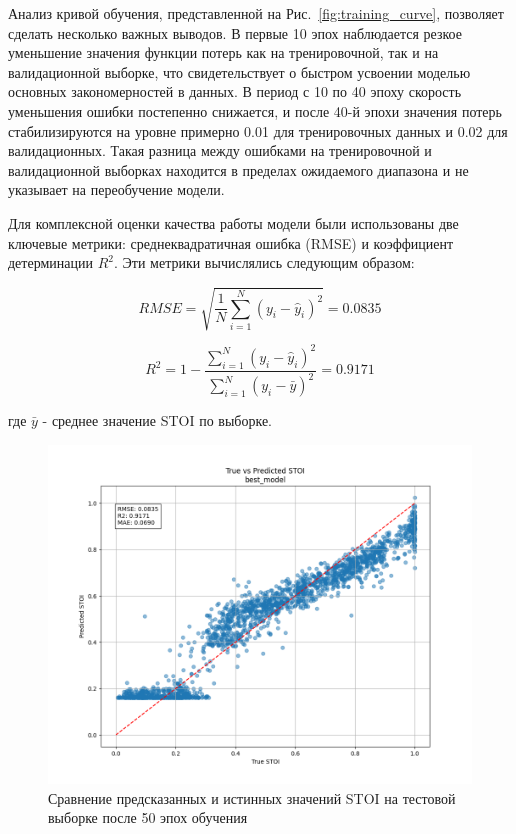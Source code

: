 \documentclass[oneside, final, 14pt]{extarticle}
\begin{document}
Анализ кривой обучения, представленной на Рис.~\ref{fig:training_curve}, позволяет сделать несколько важных выводов. В первые 10 эпох наблюдается резкое уменьшение значения функции потерь как на тренировочной, так и на валидационной выборке, что свидетельствует о быстром усвоении моделью основных закономерностей в данных. В период с 10 по 40 эпоху скорость уменьшения ошибки постепенно снижается, и после 40-й эпохи значения потерь стабилизируются на уровне примерно 0.01 для тренировочных данных и 0.02 для валидационных. Такая разница между ошибками на тренировочной и валидационной выборках находится в пределах ожидаемого диапазона и не указывает на переобучение модели.

Для комплексной оценки качества работы модели были использованы две ключевые метрики: среднеквадратичная ошибка (RMSE) и коэффициент детерминации $R^2$. Эти метрики вычислялись следующим образом:

\begin{equation}
RMSE = \sqrt{\frac{1}{N}\sum_{i=1}^N(y_i - \hat{y}_i)^2} = 0.0835
\end{equation}

\begin{equation}
R^2 = 1 - \frac{\sum_{i=1}^N(y_i - \hat{y}_i)^2}{\sum_{i=1}^N(y_i - \bar{y})^2} = 0.9171
\end{equation}

где $\bar{y}$ - среднее значение STOI по выборке.

\begin{figure}[]
\centering
\includegraphics[width=1\linewidth]{best_model_scatter.png}
\caption{Сравнение предсказанных и истинных значений STOI на тестовой выборке после 50 эпох обучения}
\label{fig:stoi_pred}
\end{figure}
\end{document}
